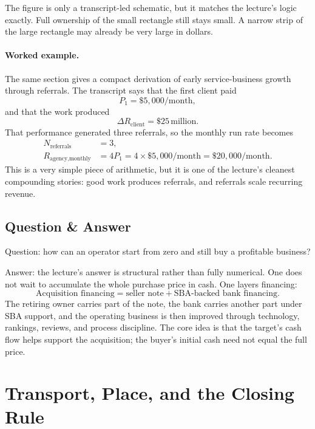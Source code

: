 The figure is only a transcript-led schematic, but it matches the lecture's logic exactly. Full ownership of the small rectangle still stays small. A narrow strip of the large rectangle may already be very large in dollars.

\paragraph{Worked example.}
The same section gives a compact derivation of early service-business growth through referrals. The transcript says that the first client paid
\begin{equation}
P_1 = \$5{,}000/\text{month},
\end{equation}
and that the work produced
\begin{equation}
\Delta R_{\text{client}} = \$25\,\text{million}.
\end{equation}
That performance generated three referrals, so the monthly run rate becomes
\begin{align}
N_{\text{referrals}} &= 3, \\
R_{\text{agency,monthly}} &= 4P_1 = 4\times \$5{,}000/\text{month} = \$20{,}000/\text{month}.
\end{align}
This is a very simple piece of arithmetic, but it is one of the lecture's cleanest compounding stories: good work produces referrals, and referrals scale recurring revenue.

\subsection{Question \& Answer}

Question: how can an operator start from zero and still buy a profitable business?

Answer: the lecture's answer is structural rather than fully numerical. One does not wait to accumulate the whole purchase price in cash. One layers financing:
\begin{equation}
\text{Acquisition financing} = \text{seller note} + \text{SBA-backed bank financing}.
\end{equation}
The retiring owner carries part of the note, the bank carries another part under SBA support, and the operating business is then improved through technology, rankings, reviews, and process discipline. The core idea is that the target's cash flow helps support the acquisition; the buyer's initial cash need not equal the full price.

\section{Transport, Place, and the Closing Rule}

